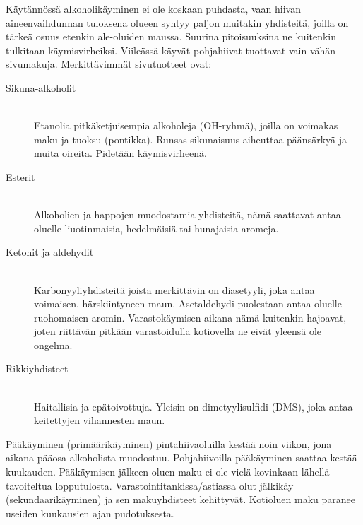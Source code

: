 \documentclass[a4paper,11pt]{report}
\begin{document}
Käytännössä alkoholikäyminen ei ole koskaan puhdasta, vaan hiivan aineenvaihdunnan tuloksena olueen syntyy paljon muitakin yhdisteitä, joilla on tärkeä osuus etenkin ale-oluiden maussa. Suurina pitoisuuksina ne kuitenkin tulkitaan käymisvirheiksi. Viileässä käyvät pohjahiivat tuottavat vain vähän sivumakuja. Merkittävimmät sivutuotteet ovat:
\begin{description}
\item[Sikuna-alkoholit] \hfill \\
Etanolia pitkäketjuisempia alkoholeja (OH-ryhmä), joilla on voimakas maku ja tuoksu (pontikka). Runsas sikunaisuus aiheuttaa päänsärkyä ja muita oireita. Pidetään käymisvirheenä.
\item[Esterit] \hfill \\
Alkoholien ja happojen muodostamia yhdisteitä, nämä saattavat antaa oluelle liuotinmaisia, hedelmäisiä tai hunajaisia aromeja.
\item[Ketonit ja aldehydit] \hfill \\
Karbonyyliyhdisteitä joista merkittävin on diasetyyli, joka antaa voimaisen, härskiintyneen maun. Asetaldehydi puolestaan antaa oluelle ruohomaisen aromin. Varastokäymisen aikana nämä kuitenkin hajoavat, joten riittävän pitkään varastoidulla kotiovella ne eivät yleensä ole ongelma.
\item[Rikkiyhdisteet] \hfill \\
Haitallisia ja epätoivottuja. Yleisin on dimetyylisulfidi (DMS), joka antaa keitettyjen vihannesten maun.
\end{description}

Pääkäyminen (primäärikäyminen) pintahiivaoluilla kestää noin viikon, jona aikana pääosa alkoholista muodostuu. Pohjahiivoilla pääkäyminen saattaa kestää kuukauden. Pääkäymisen jälkeen oluen maku ei ole vielä kovinkaan lähellä tavoiteltua lopputulosta. Varastointitankissa/astiassa olut jälkikäy (sekundaarikäyminen) ja sen makuyhdisteet kehittyvät. Kotioluen maku paranee useiden kuukausien ajan pudotuksesta.
\end{document}
